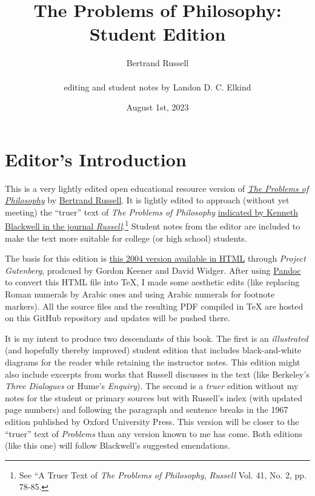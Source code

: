 \documentclass[oneside,letterpaper,12pt]{book}
\begin{document}
\title{The Problems of Philosophy: Student Edition}
\author{Bertrand Russell \\ \\ editing and student notes by Landon D. C. Elkind}
\date{August 1st, 2023}

\frontmatter

\maketitle

\chapter*{Editor's Introduction}
This is a very lightly edited open educational resource version of \href{https://archive.org/details/theproblemsofphi00russuoft}{\emph{The Problems of Philosophy}} by \href{https://bertrandrussellsociety.org/bertrand-russell/}{Bertrand Russell}. It is lightly edited to approach (without yet meeting) the ``truer'' text of \emph{The Problems of Philosophy} \href{https://mulpress.mcmaster.ca/russelljournal/article/view/4810}{indicated by Kenneth Blackwell in the journal \emph{Russell}}.\footnote{See ``A Truer Text of \emph{The Problems of Philosophy}, \emph{Russell} Vol. 41, No. 2, pp. 78-85.} Student notes from the editor are included to make the text more suitable for college (or high school) students. 

The basis for this edition is \href{https://www.gutenberg.org/cache/epub/5827/pg5827-images.html}{this 2004 version available in HTML} through \emph{Project Gutenberg}, prodcued by Gordon Keener and David Widger. After using \href{https://pandoc.org/}{Pandoc} to convert this HTML file into TeX, I made some aesthetic edits (like replacing Roman numerals by Arabic ones and using Arabic numerals for footnote markers). All the source files and the resulting PDF compiled in TeX are hosted on this GitHub repository and updates will be pushed there.

It is my intent to produce two descendants of this book. The first is an \emph{illustrated} (and hopefully thereby improved) student edition that includes black-and-white diagrams for the reader while retaining the instructor notes. This edition might also include excerpts from works that Russell discusses in the text (like Berkeley's \emph{Three Dialogues} or Hume's \emph{Enquiry}). The second is a \emph{truer} edition without my notes for the student or primary sources but with Russell's index (with updated page numbers) and following the paragraph and sentence breaks in the 1967 edition published by Oxford University Press. This version will be closer to the ``truer'' text of \emph{Problems} than any version known to me has come. Both editions (like this one) will follow Blackwell's suggested emendations.
\end{document}
